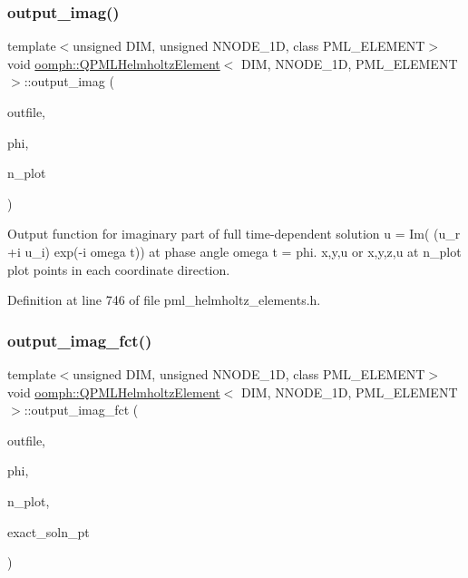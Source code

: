 \subsubsection{\texorpdfstring{output\+\_\+imag()}{output\_imag()}}
{\footnotesize\ttfamily template$<$unsigned D\+IM, unsigned N\+N\+O\+D\+E\+\_\+1D, class P\+M\+L\+\_\+\+E\+L\+E\+M\+E\+NT$>$ \\
void \hyperlink{classoomph_1_1QPMLHelmholtzElement}{oomph\+::\+Q\+P\+M\+L\+Helmholtz\+Element}$<$ D\+IM, N\+N\+O\+D\+E\+\_\+1D, P\+M\+L\+\_\+\+E\+L\+E\+M\+E\+NT $>$\+::output\+\_\+imag (\begin{DoxyParamCaption}\item[{std\+::ostream \&}]{outfile,  }\item[{const double \&}]{phi,  }\item[{const unsigned \&}]{n\+\_\+plot }\end{DoxyParamCaption})\hspace{0.3cm}{\ttfamily [inline]}}



Output function for imaginary part of full time-\/dependent solution u = Im( (u\+\_\+r +i u\+\_\+i) exp(-\/i omega t)) at phase angle omega t = phi. x,y,u or x,y,z,u at n\+\_\+plot plot points in each coordinate direction. 



Definition at line 746 of file pml\+\_\+helmholtz\+\_\+elements.\+h.

\mbox{\label{classoomph_1_1QPMLHelmholtzElement_a320db04f4b93671c91041ff1728727cf}} 
\subsubsection{\texorpdfstring{output\+\_\+imag\+\_\+fct()}{output\_imag\_fct()}}
{\footnotesize\ttfamily template$<$unsigned D\+IM, unsigned N\+N\+O\+D\+E\+\_\+1D, class P\+M\+L\+\_\+\+E\+L\+E\+M\+E\+NT$>$ \\
void \hyperlink{classoomph_1_1QPMLHelmholtzElement}{oomph\+::\+Q\+P\+M\+L\+Helmholtz\+Element}$<$ D\+IM, N\+N\+O\+D\+E\+\_\+1D, P\+M\+L\+\_\+\+E\+L\+E\+M\+E\+NT $>$\+::output\+\_\+imag\+\_\+fct (\begin{DoxyParamCaption}\item[{std\+::ostream \&}]{outfile,  }\item[{const double \&}]{phi,  }\item[{const unsigned \&}]{n\+\_\+plot,  }\item[{\hyperlink{classoomph_1_1FiniteElement_a690fd33af26cc3e84f39bba6d5a85202}{Finite\+Element\+::\+Steady\+Exact\+Solution\+Fct\+Pt}}]{exact\+\_\+soln\+\_\+pt }\end{DoxyParamCaption})\hspace{0.3cm}{\ttfamily [inline]}}




